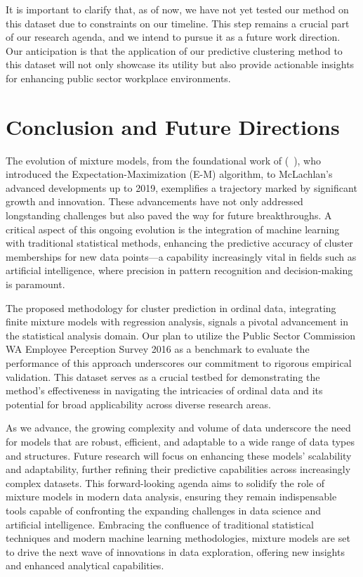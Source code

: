 \documentclass{article}
\begin{document}
It is important to clarify that, as of now, we have not yet tested our method on this dataset due to constraints on our timeline. This step remains a crucial part of our research agenda, and we intend to pursue it as a future work direction. 
Our anticipation is that the application of our predictive clustering method to this dataset will not only showcase its utility but also provide actionable insights for enhancing public sector workplace environments.

\section{Conclusion and Future Directions}

The evolution of mixture models, from the foundational work of (~\cite{dempster1977maximum}), who introduced the Expectation-Maximization (E-M) algorithm, to McLachlan's advanced developments up to 2019, exemplifies a trajectory marked by significant growth and innovation. These advancements have not only addressed longstanding challenges but also paved the way for future breakthroughs. A critical aspect of this ongoing evolution is the integration of machine learning with traditional statistical methods, enhancing the predictive accuracy of cluster memberships for new data points—a capability increasingly vital in fields such as artificial intelligence, where precision in pattern recognition and decision-making is paramount.

The proposed methodology for cluster prediction in ordinal data, integrating finite mixture models with regression analysis, signals a pivotal advancement in the statistical analysis domain. Our plan to utilize the Public Sector Commission WA Employee Perception Survey 2016 as a benchmark to evaluate the performance of this approach underscores our commitment to rigorous empirical validation. This dataset serves as a crucial testbed for demonstrating the method's effectiveness in navigating the intricacies of ordinal data and its potential for broad applicability across diverse research areas.

As we advance, the growing complexity and volume of data underscore the need for models that are robust, efficient, and adaptable to a wide range of data types and structures. Future research will focus on enhancing these models' scalability and adaptability, further refining their predictive capabilities across increasingly complex datasets. This forward-looking agenda aims to solidify the role of mixture models in modern data analysis, ensuring they remain indispensable tools capable of confronting the expanding challenges in data science and artificial intelligence. Embracing the confluence of traditional statistical techniques and modern machine learning methodologies, mixture models are set to drive the next wave of innovations in data exploration, offering new insights and enhanced analytical capabilities.

\printbibliography
\end{document}
